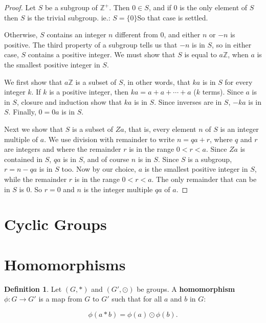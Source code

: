 \documentclass[
]{book}
\theoremstyle{definition}
\newtheorem{definition}{Definition}[chapter]
\theoremstyle{definition}
\theoremstyle{definition}
\theoremstyle{definition}
\theoremstyle{remark}
\begin{document}
\begin{proof}
Let \(S\) be a subgroup of \(\mathbb{Z}^+\). Then \(0\in S\), and if \(0\) is the only element of \(S\) then \(S\) is the trivial subgroup. ie.: \(S=\{0\}\)So that case is settled.

Otherwise, \(S\) contains an integer \(n\) different from \(0\), and either \(n\) or \(-n\) is positive. The third property of a subgroup tells us that \(-n\) is in \(S\), so in either case, \(S\) contains a positive integer. We must show that \(S\) is equal to \(a\mathbb{Z}\), when \(a\) is the smallest positive integer in \(S\).

We first show that \(a\mathbb{Z}\) is a subset of \(S\), in other words, that \(ka\) is in \(S\) for every integer \(k\). If \(k\) is a positive integer, then \(ka = a + a + \cdots + a\) (\(k\) terms). Since \(a\) is in \(S\), closure and induction show that \(ka\) is in \(S\). Since inverses are in \(S\), \(-ka\) is in \(S\). Finally, \(0 = 0a\) is in \(S\).

Next we show that \(S\) is a subset of \(Za\), that is, every element \(n\) of \(S\) is an integer multiple of \(a\). We use division with remainder to write \(n = qa + r\), where \(q\) and \(r\) are integers and where the remainder \(r\) is in the range \(0 < r < a\). Since \(Za\) is contained in \(S\), \(qa\) is in \(S\), and of course \(n\) is in \(S\). Since \(S\) is a subgroup, \(r = n - qa\) is in \(S\) too. Now by our choice, \(a\) is the smallest positive integer in \(S\), while the remainder \(r\) is in the range \(0 < r < a\). The only remainder that can be in \(S\) is \(0\). So \(r = 0\) and \(n\) is the integer multiple \(qa\) of \(a\).
\end{proof}

\hypertarget{cyclic-groups}{%
\section{Cyclic Groups}\label{cyclic-groups}}

\hypertarget{homomorphisms}{%
\section{Homomorphisms}\label{homomorphisms}}

\begin{definition}
\protect\hypertarget{def:unnamed-chunk-17}{}\label{def:unnamed-chunk-17}Let \((G, *)\) and \((G', \odot)\) be groups. A \textbf{homomorphism} \(\phi: G \rightarrow G'\) is a map from \(G\) to \(G'\) such that for all \(a\) and \(b\) in \(G\):

\begin{equation}
    \phi(a * b) = \phi(a) \odot \phi(b).
\end{equation}
\end{definition}
\end{document}
